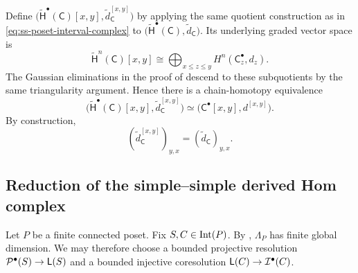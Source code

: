 Define
$\bigl(\widetilde{\mathsf H}^\bullet(\mathsf C)[x,y],
\widetilde d_{\mathsf C}^{[x,y]}\bigr)$
by applying the same quotient construction as in
\eqref{eq:ss-poset-interval-complex} to
$\bigl(\widetilde{\mathsf H}^\bullet(\mathsf C),
\widetilde d_{\mathsf C}\bigr)$.
Its underlying graded vector space is
\begin{equation}
\label{eq:ss-reduced-interval-complex}
\widetilde{\mathsf H}^n(\mathsf C)[x,y]
\cong
\bigoplus_{x\leq z\leq y}
H^n(\mathsf C_z^\bullet,d_z).
\end{equation}
The Gaussian eliminations in the proof of
 descend to these
subquotients by the same triangularity argument. Hence there is a
chain-homotopy equivalence
\begin{equation}
\label{eq:ss-reduced-interval-equivalence}
\bigl(
\widetilde{\mathsf H}^\bullet(\mathsf C)[x,y],
\widetilde d_{\mathsf C}^{[x,y]}
\bigr)
\simeq
\bigl(
\mathsf C^\bullet[x,y],d^{[x,y]}
\bigr).
\end{equation}
By construction,
\begin{equation}
\label{eq:ss-reduced-interval-locality}
(\widetilde d_{\mathsf C}^{[x,y]})_{y,x}
=
(\widetilde d_{\mathsf C})_{y,x}.
\end{equation}



\subsection{Reduction of the simple--simple derived Hom complex}
\label{app:ss-reduction-of-simple-simple-derived-hom-complex}
Let $P$ be a finite connected poset. 
Fix $S,C\in\operatorname{Int}(P)$.  By ,
$\Lambda_P$ has finite global dimension.  We may therefore choose a
bounded projective resolution
$\mathcal P^\bullet(S)\to\mathsf L(S)$ and a bounded injective coresolution
$\mathsf L(C)\to\mathcal I^\bullet(C)$.

